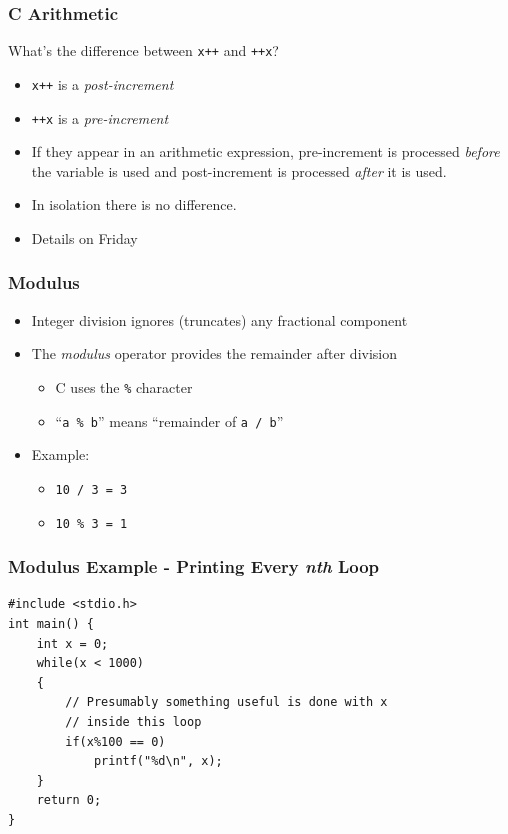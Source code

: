 \documentclass[14pt]{beamer}
\begin{document}
\begin{frame}
\frametitle{C Arithmetic}
What's the difference between \texttt{x++} and \texttt{++x}?
\begin{itemize}
\item \texttt{x++} is a \textit{post-increment}
\item \texttt{++x} is a \textit{pre-increment}
\item If they appear in an arithmetic expression, pre-increment is processed \textit{before} the variable is used and post-increment is processed \textit{after} it is used.
\item In isolation there is no difference.
\item Details on Friday
\end{itemize}
\end{frame}



\begin{frame}
\frametitle{Modulus}
\begin{itemize}
\item Integer division ignores (truncates) any fractional component
\item The \textit{modulus} operator provides the remainder after division
\begin{itemize}
	\item C uses the \texttt{\%} character
	\item ``\texttt{a \% b}'' means ``remainder of \texttt{a / b}''
\end{itemize}
\item Example:
	\begin{itemize}	
		\item \texttt{10 / 3 = 3}
		\item \texttt{10 \% 3 = 1}
	\end{itemize}
\end{itemize}
\end{frame}

\begin{frame}[fragile]
\frametitle{Modulus Example - Printing Every \textit{nth} Loop}
\begin{lstlisting}[style=CStyle,caption=\texttt{loopmod.c}]
#include <stdio.h>
int main() {
	int x = 0;
	while(x < 1000)
	{
		// Presumably something useful is done with x
		// inside this loop
		if(x%100 == 0)
			printf("%d\n", x);
	}
	return 0;
}
\end{lstlisting}
\end{frame}
\end{document}
